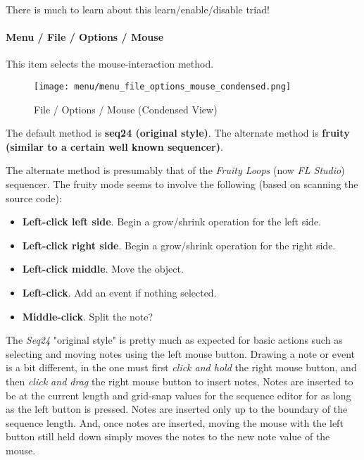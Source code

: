   There is much to learn about this learn/enable/disable triad!

\paragraph{Menu / File / Options / Mouse }
\label{paragraph:seq64_menu_file_options_mouse}

   This item selects the mouse-interaction method.

\begin{figure}[H]
   \centering 
   \texttt{[image: menu/menu\_file\_options\_mouse\_condensed.png]}
   \caption{File / Options / Mouse (Condensed View)}
   \label{fig:seq64_menu_file_options_mouse}
\end{figure}

   The default method is \textbf{seq24 (original style)}.
   The alternate method is \textbf{fruity (similar to a certain well known
   sequencer)}.

   The alternate method is presumably that of the \textsl{Fruity Loops}
   (now \textsl{FL Studio}) sequencer.  The fruity mode seems to involve the
   following (based on scanning the source code):
   
   \begin{itemize}
      \item \textbf{Left-click left side}.
         Begin a grow/shrink operation for the left side.
      \item \textbf{Left-click right side}.
         Begin a grow/shrink operation for the right side.
      \item \textbf{Left-click middle}.
         Move the object.
      \item \textbf{Left-click}.
         Add an event if nothing selected.
      \item \textbf{Middle-click}.
         Split the note?
   \end{itemize}

   The \textsl{Seq24} "original style" is pretty much as expected for basic
   actions such as selecting and moving notes using the left mouse button.
   Drawing a note or event is a bit different, in the one must first
   \textsl{click and hold} the right mouse button, and then
   \textsl{click and drag} the right mouse button to insert notes,
   Notes are inserted to be at the current length and grid-snap values for
   the sequence editor for as long as the left button is pressed.
   Notes are inserted only up to the boundary of the sequence length.
   And, once notes are inserted, moving the mouse with the left button still
   held down simply moves the notes to the new note value of the mouse.

